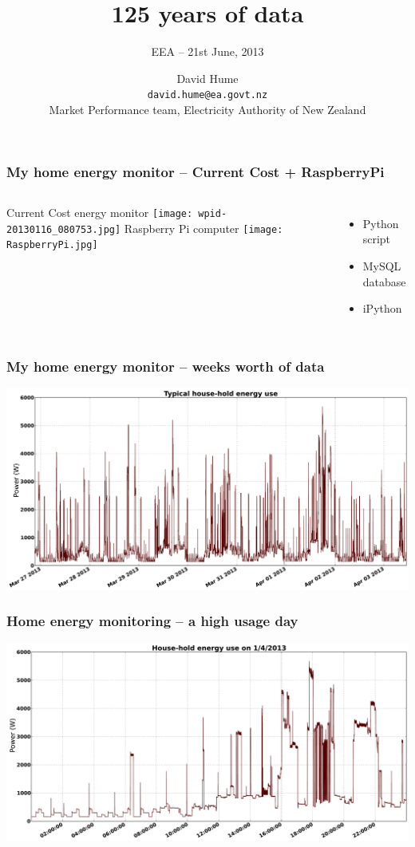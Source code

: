 \documentclass[aspectratio=169]{beamer}
\title[125 years of data]{\huge 125 years of data}
\subtitle{\tiny EEA -- 21st June, 2013} %
\author[David Hume]{\footnotesize David Hume\normalsize  \\ \tiny {\texttt{david.hume@ea.govt.nz}} \\ \tiny Market Performance team, Electricity Authority of New Zealand}
\date{}
\begin{document}
\frame{\titlepage}


\frame
{\frametitle{My home energy monitor -- Current Cost + RaspberryPi}
\begin{columns}[t]
  \column[T]{5cm}
  Current Cost energy monitor
      \texttt{[image: wpid-20130116\_080753.jpg]} 
  \column[T]{5cm}
  \vspace{5mm}
  Raspberry Pi computer
  \texttt{[image: RaspberryPi.jpg]}
  \begin{itemize}
  \item Python script
  \item MySQL database
  \item iPython
  \end{itemize}
\end{columns}
}

\frame
{\frametitle{My home energy monitor -- weeks worth of data}
\begin{center}
\includegraphics[width=14cm]{./notebooks/125_years_of_data_files/125_years_of_data_fig_03.pdf} 
\end{center}
}


\frame
{\frametitle{Home energy monitoring -- a high usage day}
\begin{center}
\includegraphics[width=14cm]{./notebooks/125_years_of_data_files/125_years_of_data_fig_04.pdf} 
\end{center}
}
\end{document}
